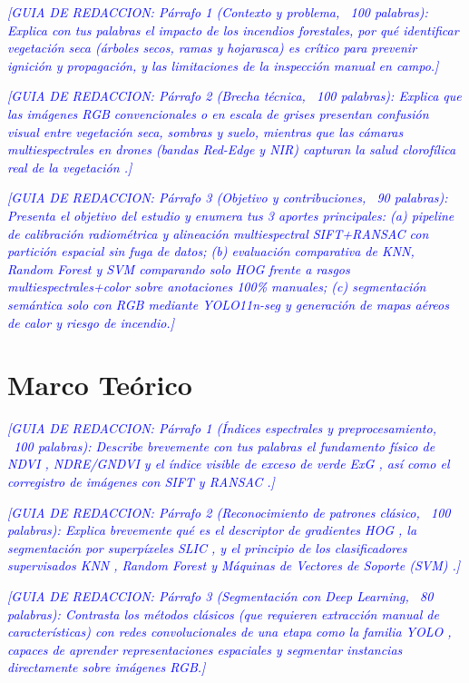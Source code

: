 \documentclass[conference]{IEEEtran}
\newcommand{\guia}[1]{\textcolor{blue}{\textit{[GUIA DE REDACCION: #1]}}}
\begin{document}
\guia{Párrafo 1 (Contexto y problema, ~100 palabras): Explica con tus palabras el impacto de los incendios forestales, por qué identificar vegetación seca (árboles secos, ramas y hojarasca) es crítico para prevenir ignición y propagación, y las limitaciones de la inspección manual en campo.}

\guia{Párrafo 2 (Brecha técnica, ~100 palabras): Explica que las imágenes RGB convencionales o en escala de grises presentan confusión visual entre vegetación seca, sombras y suelo, mientras que las cámaras multiespectrales en drones (bandas Red-Edge y NIR) capturan la salud clorofílica real de la vegetación \cite{rouse1974ndvi,gitelson1997ndre}.}

\guia{Párrafo 3 (Objetivo y contribuciones, ~90 palabras): Presenta el objetivo del estudio y enumera tus 3 aportes principales:
(a) pipeline de calibración radiométrica y alineación multiespectral SIFT+RANSAC con partición espacial sin fuga de datos;
(b) evaluación comparativa de KNN, Random Forest y SVM comparando solo HOG frente a rasgos multiespectrales+color sobre anotaciones 100\% manuales;
(c) segmentación semántica solo con RGB mediante YOLO11n-seg y generación de mapas aéreos de calor y riesgo de incendio.}

\section{Marco Teórico}

\guia{Párrafo 1 (Índices espectrales y preprocesamiento, ~100 palabras): Describe brevemente con tus palabras el fundamento físico de NDVI \cite{rouse1974ndvi}, NDRE/GNDVI \cite{gitelson1997ndre} y el índice visible de exceso de verde ExG \cite{woebbecke1995exg}, así como el corregistro de imágenes con SIFT \cite{lowe2004sift} y RANSAC \cite{fischler1981ransac}.}

\guia{Párrafo 2 (Reconocimiento de patrones clásico, ~100 palabras): Explica brevemente qué es el descriptor de gradientes HOG \cite{dalal2005hog}, la segmentación por superpíxeles SLIC \cite{achanta2012slic}, y el principio de los clasificadores supervisados KNN \cite{cover1967knn}, Random Forest \cite{breiman2001rf} y Máquinas de Vectores de Soporte (SVM) \cite{cortes1995svm}.}

\guia{Párrafo 3 (Segmentación con Deep Learning, ~80 palabras): Contrasta los métodos clásicos (que requieren extracción manual de características) con redes convolucionales de una etapa como la familia YOLO \cite{redmon2016yolo,jocher2024yolo11}, capaces de aprender representaciones espaciales y segmentar instancias directamente sobre imágenes RGB.}
\end{document}
